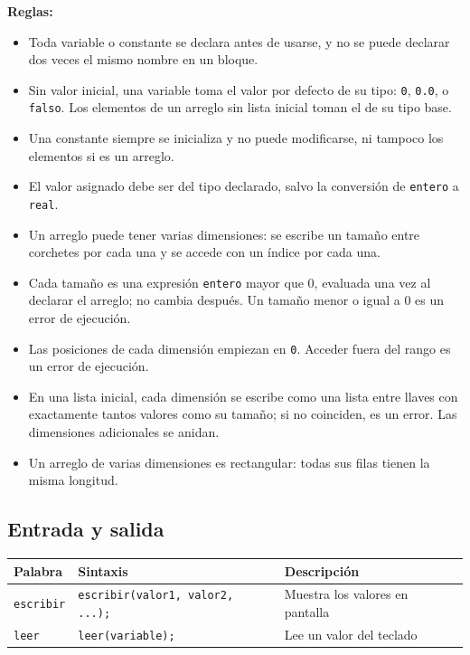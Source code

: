 \documentclass[spanish,11pt,letterpaper]{article}
\begin{document}
	\textbf{Reglas:}
	\begin{itemize}
		\item Toda variable o constante se declara antes de usarse, y no se puede declarar dos veces el mismo nombre en un bloque.
		\item Sin valor inicial, una variable toma el valor por defecto de su tipo: \texttt{0}, \texttt{0.0}, \texttt{\textquotedbl\textquotedbl} o \texttt{falso}. Los
		elementos de un arreglo sin lista inicial toman el de su tipo base.
		\item Una constante siempre se inicializa y no puede modificarse, ni tampoco los elementos si es un arreglo.
		\item El valor asignado debe ser del tipo declarado, salvo la
		conversi\'on de \texttt{entero} a \texttt{real}.
		\item Un arreglo puede tener varias dimensiones: se escribe un tama\~no entre corchetes por cada una y se accede con un \'indice por cada una.
		\item Cada tama\~no es una expresi\'on \texttt{entero} mayor que 0, evaluada una vez al declarar el arreglo; no cambia despu\'es. Un tama\~no menor o igual a 0 es un error de ejecuci\'on.
		\item Las posiciones de cada dimensi\'on empiezan en \texttt{0}. Acceder
		fuera del rango es un error de ejecuci\'on.
		\item En una lista inicial, cada dimensi\'on se escribe como una lista entre llaves con exactamente tantos valores como su tama\~no; si no
		coinciden, es un error. Las dimensiones adicionales se anidan.
		\item Un arreglo de varias dimensiones es rectangular: todas sus filas tienen la misma longitud.
	\end{itemize}
	
	\subsection{Entrada y salida}
	\begin{center}
		\begin{tabular}{@{}lll@{}}
			\toprule
			\textbf{Palabra} & \textbf{Sintaxis} & \textbf{Descripci\'on} \\
			\midrule
			\texttt{escribir} & \texttt{escribir(valor1, valor2, ...);} & Muestra los valores en pantalla \\
			\texttt{leer} & \texttt{leer(variable);} & Lee un valor del teclado \\
			\bottomrule
		\end{tabular}
	\end{center}
	
\end{document}

